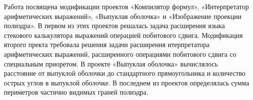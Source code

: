 Работа посвящена модификации проектов «Компилятор формул»,
«Интерпретатор арифметических выражений», «Выпуклая оболочка» и
«Изображение проекции полиэдра». В первом из этих проектов решалась
задача расширения языка стекового калькулятора выражений операцией побитового сдвига.
Модификация второго пректа требовала решения задачи расширения итерпретатора
арифметических выражений, расширенного операциями побитового сдвига со специальным
приоретом. В проекте «Выпуклая оболочка» вычислялось расстояние от выпуклой оболочки до стандартного прямоугольника и количество острых углов в выпуклой оболочке. В последнем из проектов
определялась сумма периметров частично видимых граней полиэдра.
